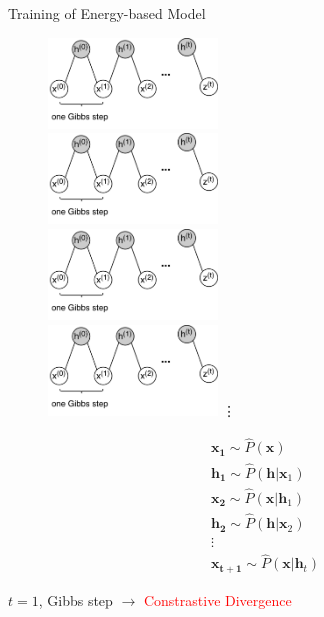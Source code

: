 	\begin{frame}[t]{Training of Energy-based Model}
		\begin{minipage}{0.48\linewidth}
		\begin{figure}
		 \includegraphics[width=0.4\textwidth]{markov_chain.png}\\
		 \includegraphics[width=0.4\textwidth]{markov_chain.png}\\
		 \includegraphics[width=0.4\textwidth]{markov_chain.png}\\
		 \includegraphics[width=0.4\textwidth]{markov_chain.png}
		 \vdots
		\end{figure}
		\end{minipage}
		\begin{minipage}{0.48\linewidth}
		      \begin{eqnarray}
			& \mathbf{x_{1}} \sim \hat{P}(\mathbf{x})\nonumber \\
			& \mathbf{h_{1}} \sim \hat{P}(\mathbf{h}|\mathbf{x}_{1})\nonumber\\
			& \mathbf{x_{2}} \sim \hat{P}(\mathbf{x}|\mathbf{h}_{1})\nonumber\\
			& \mathbf{h_{2}} \sim \hat{P}(\mathbf{h}|\mathbf{x}_{2})\nonumber\\
			& \vdots \\
			& \mathbf{x_{t+1}} \sim \hat{P}(\mathbf{x}|\mathbf{h}_{t})\nonumber
		      \end{eqnarray}
		\end{minipage}
	$t=1$, Gibbs step $\rightarrow$ \textcolor{red}{Constrastive Divergence}
	\end{frame}



